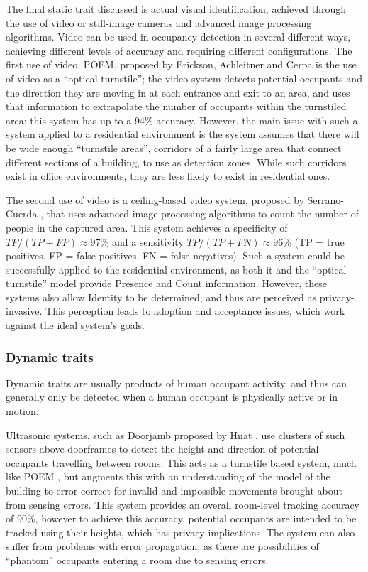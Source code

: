 \documentclass[../thesis/thesis.tex]{subfiles}
\begin{document}
The final static trait discussed is actual visual identification, achieved through the use of video or still-image cameras and advanced image processing algorithms. Video can be used in occupancy detection in several different ways, achieving different levels of accuracy and requiring different configurations. The first use of video, POEM, proposed by Erickson, Achleitner and Cerpa \cite{erickson2013poem} is the use of video as a ``optical turnstile''; the video system detects potential occupants and the direction they are moving in at each entrance and exit to an area, and uses that information to extrapolate the number of occupants within the turnstiled area; this system has up to a 94\% accuracy. However, the main issue with such a system applied to a residential environment is the system assumes that there will be wide enough ``turnstile areas'', corridors of a fairly large area that connect different sections of a building, to use as detection zones. While such corridors exist in office environments, they are less likely to exist in residential ones.

The second use of video is a ceiling-based video system, proposed by Serrano-Cuerda \etal \cite{serrano2013efficient}, that uses advanced image processing algorithms to count the number of people in the captured area. This system achieves a specificity of $\mathit{TP}/(\mathit{TP}+\mathit{FP})\approx97\%$ and a sensitivity $\mathit{TP}/(\mathit{TP}+\mathit{FN})\approx96\%$ (TP = true positives, FP = false positives, FN = false negatives). Such a system could be successfully applied to the residential environment, as both it and the ``optical turnstile'' model provide Presence and Count information. However, these systems also allow Identity to be determined, and thus are perceived as privacy-invasive. This perception leads to adoption and acceptance issues, which work against the ideal system's goals.

\subsubsection{Dynamic traits}
\label{subsubsec:litreview:sensors:intrinsic:dynamic}
Dynamic traits are usually products of human occupant activity, and thus can generally only be detected when a human occupant is physically active or in motion.

Ultrasonic systems, such as Doorjamb proposed by Hnat \etal \cite{hnat2012doorjamb}, use clusters of such sensors above doorframes to detect the height and direction of potential occupants travelling between rooms. This acts as a turnstile based system, much like POEM \cite{erickson2013poem}, but augments this with an understanding of the model of the building to error correct for invalid and impossible movements brought about from sensing errors. This system provides an overall room-level tracking accuracy of 90\%, however to achieve this accuracy, potential occupants are intended to be tracked using their heights, which has privacy implications. The system can also suffer from problems with error propagation, as there are possibilities of ``phantom'' occupants entering a room due to sensing errors.
\end{document}
